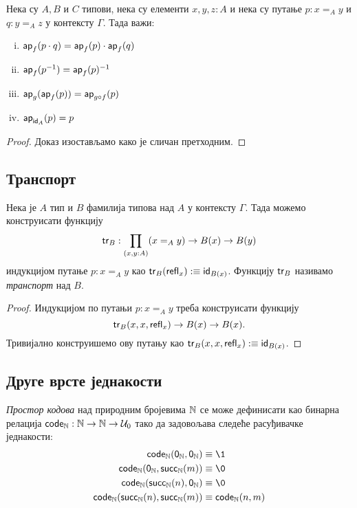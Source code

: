 \documentclass[12pt,oneside]{memoir}
\begin{document}
\begin{lemma}
    Нека су $A, B$ и $C$ типови, нека су елементи $x, y, z : A$ и нека су путање $p : x =_A y$ и $q : y =_A z$ у контексту $\Gamma$. Тада важи:
    \begin{enumerate}[(i)]
        \item $\mathsf{ap}_{f} (p \cdot q) = \mathsf{ap}_{f}(p) \cdot \mathsf{ap}_{f}(q)$
        \item $\mathsf{ap}_{f} (p^{-1}) = \mathsf{ap}_{f}(p)^{-1}$
        \item $\mathsf{ap}_{g} (\mathsf{ap}_{f} (p)) = \mathsf{ap}_{g \circ f} (p)$
        \item $\mathsf{ap}_{\mathsf{id}_{A}} (p) = p$
    \end{enumerate}
\end{lemma}
\begin{proof}
    Доказ изостављамо како је сличан претходним.
\end{proof}

\subsection{Транспорт}

\begin{lemma}
    Нека је $A$ тип и $B$ фамилија типова над $A$ у контексту $\Gamma$. Тада можемо конструисати функцију
    \[\mathsf{tr}_{B} : \prod_{(x,y:A)} (x =_{A} y) \to B(x) \to B(y)\]
    индукцијом путање $p : x =_{A} y$ као $\mathsf{tr}_{B}(\mathsf{refl}_{x}) :\equiv \mathsf{id}_{B(x)}$.
Функцију $\mathsf{tr}_{B}$ називамо \emph{транспорт} над $B$.
\end{lemma}
\begin{proof}
    Индукцијом по путањи $p : x =_{A} y$ треба конструисати функцију
    \[\mathsf{tr}_{B}(x, x, \mathsf{refl}_{x}) \to B(x) \to B(x).\]
    Тривијално конструишемо ову путању као $\mathsf{tr}_{B} (x, x, \mathsf{refl}_{x}) :\equiv \mathsf{id}_{B(x)}$.
\end{proof}

\subsection{Друге врсте једнакости}

\begin{definition}
    \label{def:code}
    {\color{red}\emph{Простор кодова}} над природним бројевима ${\mathbb{N}}$ се може дефинисати као бинарна релација $\mathsf{code}_{{\mathbb{N}}} : {\mathbb{N}} \to {\mathbb{N}} \to \mathcal{U}_0$ тако да задовољава следеће расуђивачке једнакости:
    \begin{align*}
        \code{\N} (\zeroN, \zeroN) &\equiv\1 \\
        \code{\N} (\zeroN, \succN(m)) &\equiv\0 \\
        \code{\N} (\succN(n), \zeroN) &\equiv\0 \\
        \code{\N} (\succN(n), \succN(m)) &\equiv\code{\N} (n, m) \\
    \end{align*}
\end{definition}
\end{document}
